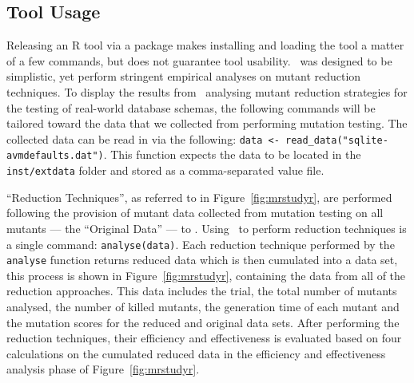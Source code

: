 \subsection{Tool Usage}





Releasing an R tool via a package makes installing and loading the tool a matter of a few commands,
but does not guarantee tool usability. \mr~was designed to be simplistic, yet perform stringent
empirical analyses on mutant reduction techniques. To display the results from \mr~analysing mutant
reduction strategies for the testing of real-world database schemas, the following commands will be
tailored toward the data that we collected from performing mutation testing. The collected data can
be read in via the following: {\small\texttt{data <- read\_data("sqlite-avmdefaults.dat")}}. This
function expects the data to be located in the \texttt{inst/extdata} folder and stored as a
comma-separated value file.






``Reduction Techniques'', as referred to in Figure~\ref{fig:mrstudyr}, are performed following the provision
of mutant data collected from mutation testing on all mutants --- the ``Original Data'' --- to \mr. Using
\mr~to perform reduction techniques is a single command: \texttt{analyse(data)}. Each reduction technique performed by
the \texttt{analyse} function returns reduced data which is then cumulated into a data set, this process is shown
in Figure~\ref{fig:mrstudyr}, containing the data from all of the reduction approaches. This data includes
the trial, the total number of mutants analysed, the number of killed mutants, the generation time of each
mutant and the mutation scores for the reduced and original data sets. After performing the reduction techniques,
their efficiency and effectiveness is evaluated based on four calculations on the cumulated reduced data in
the efficiency and effectiveness analysis phase of Figure~\ref{fig:mrstudyr}.

